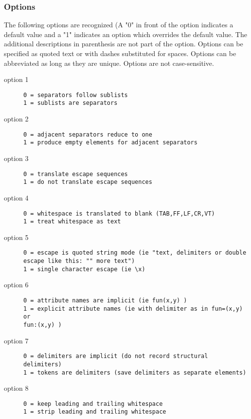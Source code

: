 \subsubsection{Options}
The following options are recognized (A "0" in front of the option indicates a default value and a "1" indicates an option which overrides the default value. The additional descriptions in parenthesis are not part of the option. Options can be specified as quoted text or with dashes substituted for spaces. Options can be abbreviated as long as they are unique. Options are not case-sensitive.
\begin{description}
\item[option 1]
\begin{verbatim}
0 = separators follow sublists
1 = sublists are separators
\end{verbatim}
\item[option 2]
\begin{verbatim}
0 = adjacent separators reduce to one
1 = produce empty elements for adjacent separators
\end{verbatim}
\item[option 3]
\begin{verbatim}
0 = translate escape sequences
1 = do not translate escape sequences
\end{verbatim}
\item[option 4]
\begin{verbatim}
0 = whitespace is translated to blank (TAB,FF,LF,CR,VT)
1 = treat whitespace as text
\end{verbatim}
\item[option 5]
\begin{verbatim}
0 = escape is quoted string mode (ie "text, delimiters or double escape like this: "" more text")
1 = single character escape (ie \x)
\end{verbatim}
\item[option 6]
\begin{verbatim}
0 = attribute names are implicit (ie fun(x,y) )
1 = explicit attribute names (ie with delimiter as in fun=(x,y) or
fun:(x,y) )
\end{verbatim}
\item[option 7]
\begin{verbatim}
0 = delimiters are implicit (do not record structural delimiters)
1 = tokens are delimiters (save delimiters as separate elements)
\end{verbatim}
\item[option 8]
\begin{verbatim}
0 = keep leading and trailing whitespace
1 = strip leading and trailing whitespace
\end{verbatim}
\end{description}
